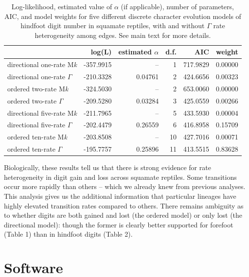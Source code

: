 \documentclass[fleqn,10pt,lineno]{wlpeerj} %
\begin{document}
\begin{table}

\caption{\label{tab:unnamed-chunk-19}Log-likelihood, estimated value of $\alpha$ (if applicable), number of parameters, AIC, and model weights for five different discrete character evolution models of hindfoot digit number in squamate reptiles, with and without $\Gamma$ rate heterogeneity among edges. See main text for more details.}
\centering
\begin{tabular}[t]{l|r|r|r|r|r}
\hline
  & log(L) & estimated $\alpha$ & d.f. & AIC & weight\\
\hline
directional one-rate M\emph{k} & -357.9915 & -- & 1 & 717.9829 & 0.00000\\
\hline
directional one-rate $\Gamma$ & -210.3328 & 0.04761 & 2 & 424.6656 & 0.00323\\
\hline
ordered two-rate M\emph{k} & -324.5030 & -- & 2 & 653.0060 & 0.00000\\
\hline
ordered two-rate $\Gamma$ & -209.5280 & 0.03284 & 3 & 425.0559 & 0.00266\\
\hline
directional five-rate M\emph{k} & -211.7965 & -- & 5 & 433.5930 & 0.00004\\
\hline
directional five-rate $\Gamma$ & -202.4479 & 0.26559 & 6 & 416.8958 & 0.15709\\
\hline
ordered ten-rate M\emph{k} & -203.8508 & -- & 10 & 427.7016 & 0.00071\\
\hline
ordered ten-rate $\Gamma$ & -195.7757 & 0.25896 & 11 & 413.5515 & 0.83628\\
\hline
\end{tabular}
\end{table}

Biologically, these results tell us that there is strong evidence for rate heterogeneity in digit gain and loss across squamate reptiles. Some transitions occur more rapidly than others -- which we already knew from previous analyses. This analysis gives us the additional information that particular lineages have highly elevated transition rates compared to others. There remains ambiguity as to whether digits are both gained and lost (the ordered model) or only lost (the directional model): though the former is clearly better supported for forefoot (Table 1) than in hindfoot digits (Table 2).

\section{Software}\label{software}
\end{document}
